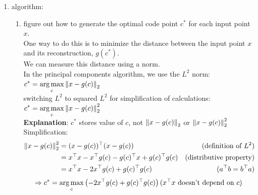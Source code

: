 \begin{enumerate}
    \item algorithm:
    \begin{enumerate}
        \item figure out how to generate the optimal code point $c^\ast$ for each input point $x$.\\
        One way to do this is to minimize the distance between the input point $x$ and its reconstruction, $g(c^\ast)$.\\
        We can measure this distance using a norm.\\
        In the principal components algorithm, we use the $L^2$ norm:
        ${
            \displaystyle
            c^\ast
            = \mathop{\arg\max}_c \left\| x - g(c) \right\|_2
        }$\\
        switching $L^2$ to squared $L^2$ for simplification of calculations:
        ${
            \displaystyle
            c^\ast
            = \mathop{\arg\max}_c \left\| x - g(c) \right\|_2^2
        }$\\
        \textbf{Explanation}: $c^\ast$ stores value of $c$, not $\left\| x - g(c) \right\|_2$ or $\left\| x - g(c) \right\|_2^2$\\
        Simplification:
        \[
        \begin{aligned}
            \left\| x - g(c) \right\|_2^2 
            &=(x-g(c))^\top(x-g(c)) & \text{(definition of $L^2$)}\\
            &= x^\top x - x^\top g(c) - g(c)^\top x + g(c)^\top g(c) & \text{(distributive property)}\\
            &= x^\top x - 2x^\top g(c) + g(c)^\top g(c) & (a^\top b = b^\top a)\\
        \end{aligned}
        \]
        \[
            \Rightarrow
            c^\ast 
            = \mathop{\arg\max}_c \dParenBrac{- 2x^\top g(c) + g(c)^\top g(c)}
            \hfill 
            \text{($x^\top x$ doesn't depend on $c$)}
        \]
    \end{enumerate}
\end{enumerate}






















